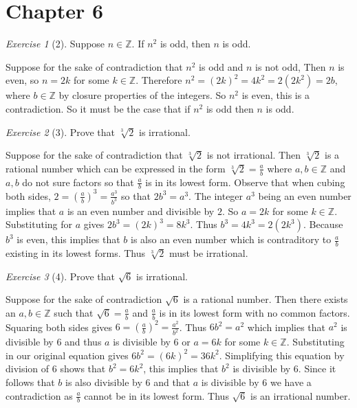 \documentclass[12pt]{amsart}
\makeatletter
\theoremstyle{remark}
\newtheorem*{exercise}{Exercise}%
\def\ZZ{\ensuremath{\mathbb Z}}
\renewenvironment{proof}[1][\proofname]{\par\doublespacing
  \pushQED{\qed}%
  \normalfont \topsep6\p@\@plus6\p@\relax
  \list{}{%
    \settowidth{\leftmargin}{\itshape\proofname:\hskip\labelsep}%
    \setlength{\labelwidth}{0pt}%
    \setlength{\itemindent}{-\leftmargin}%
  }%
  \item[\hskip\labelsep\itshape#1\@addpunct{:}]\ignorespaces
}{%
  \popQED\endlist\@endpefalse
  \singlespacing
}
\theoremstyle{mycomment}
\makeatother
\begin{document}
\thispagestyle{fancy}

\section*{Chapter 6}
\begin{exercise}[2] Suppose $n\in\ZZ$. If $n^{2}$ is odd, then $n$ is odd.
\begin{proof}
  Suppose for the sake of contradiction that $n^2$ is odd and $n$ is not odd, Then $n$ is even, so $n = 2k$ for some $k\in\ZZ$. Therefore $n^2 = (2k)^2 = 4k^2 = 2(2k^2) = 2b$, where $b\in\ZZ$ by closure properties of the integers. So $n^2$ is even, this is a contradiction. So it must be the case that if $n^2$ is odd then $n$ is odd. 
\end{proof}
\end{exercise}

\begin{exercise}[3] Prove that $\sqrt[3]{2}$ is irrational.
\begin{proof}
  Suppose for the sake of contradiction that $\sqrt[3]{2}$ is not irrational. Then $\sqrt[3]{2}$ is a rational number which can be expressed in the form $\sqrt[3]{2} = \frac{a}{b}$ where $a,b\in\ZZ$ and $a,b$ do not sure factors so that $\frac{a}{b}$ is in its lowest form. Observe that when cubing both sides, $2 = (\frac{a}{b})^3 = \frac{a^3}{b^3}$ so that $2b^3 = a^3$. The integer $a^3$ being an even number implies that $a$ is an even number and divisible by $2$. So $a = 2k$ for some $k\in\ZZ$. Substituting for $a$ gives $2b^3 = (2k)^3 = 8k^3$. Thus $b^3 = 4k^3 = 2(2k^3)$.  Because $b^3$ is even, this implies that $b$ is also an even number which is contraditory to $\frac{a}{b}$ existing in its lowest forms. Thus $\sqrt[3]{2}$ must be irrational.
\end{proof}
\end{exercise}

\begin{exercise}[4] Prove that $\sqrt{6}$ is irrational.
\begin{proof}
  Suppose for the sake of contradiction $\sqrt{6}$ is a rational number. Then there exists an $a,b\in\ZZ$ such that $\sqrt{6} = \frac{a}{b}$ and $\frac{a}{b}$ is in its lowest form with no common factors. Squaring both sides gives $6 = (\frac{a}{b})^2 = \frac{a^2}{b^2}$. Thus $6b^2 = a^2$ which implies that $a^2$ is divisible by $6$ and thus $a$ is divisible by $6$ or $a = 6k$ for some $k\in\ZZ$. Substituting in our original equation gives $6b^2 = (6k)^2 = 36k^2$. Simplifying this equation by division of $6$ shows that $b^2 = 6k^2$, this implies that $b^2$ is divisible by $6$. Since it follows that $b$ is also divisible by $6$ and that $a$ is divisible by $6$ we have a contradiction as $\frac{a}{b}$ cannot be in its lowest form. Thus $\sqrt{6}$ is an irrational number. 
\end{proof}
\end{exercise}
\end{document}
